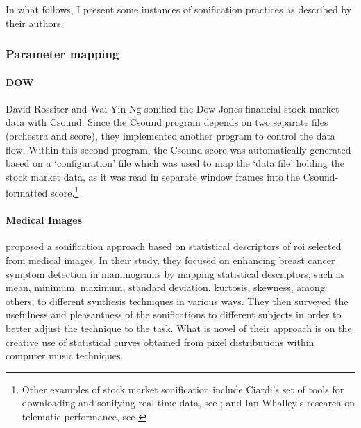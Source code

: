 In what follows, I present some instances of sonification practices as described by their authors.

\subsubsection{Parameter mapping}
\label{sonification:parametermapping}

\paragraph{DOW}
David Rossiter and Wai-Yin Ng \parencite{icmc/bbp2372.1996.085} sonified the Dow Jones financial stock market data with Csound. Since the Csound program depends on two separate files (orchestra and score), they implemented another program to control the data flow. Within this second program, the Csound score was automatically generated based on a `configuration' file which was used to map the `data file' holding the stock market data, as it was read in separate window frames into the Csound-formatted score.\footnote{Other examples of stock market sonification include Ciardi's set of tools for downloading and sonifying real-time data, see \parencite{icmc/bbp2372.2004.124}; and Ian Whalley's research on telematic performance, see \parencite{icmc/bbp2372.2014.046}}

\paragraph{Medical Images}
\citeauthor{DBLP:conf/icmc/CadizCMMATI15} \parencite{DBLP:conf/icmc/CadizCMMATI15} proposed a sonification approach based on statistical descriptors of \gls{roi} selected from medical images. In their study, they focused on enhancing breast cancer symptom detection in mammograms by mapping statistical descriptors, such as mean, minimum, maximum, standard deviation, kurtosis, skewness, among others, to different synthesis techniques in various ways. They then surveyed the usefulness and pleasantness of the sonifications to different subjects in order to better adjust the technique to the task. What is novel of their approach is on the creative use of statistical curves obtained from pixel distributions within computer music techniques.



